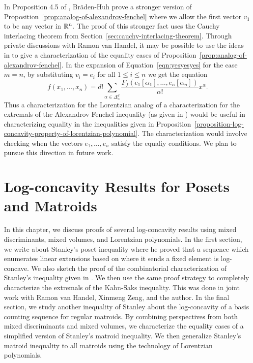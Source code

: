 \documentclass{puthesis-UG}
\begin{document}
\begin{remark}
	In Proposition 4.5 of \cite{lorentzian-polynomials}, Br\"aden-Huh prove a stronger version of Proposition~\ref{prop:analog-of-alexandrov-fenchel} where we allow the first vector $v_1$ to be any vector in $\mathbb{R}^n$. The proof of this stronger fact uses the Cauchy interlacing theorem from Section~\ref{sec:cauchy-interlacing-theorem}. Through private discussions with Ramon van Handel, it may be possible to use the ideas in \cite{shenfeld2022extremals} to give a characterization of the equality cases of Proposition~\ref{prop:analog-of-alexandrov-fenchel}. In the expansion of Equation~\ref{eqn:yesyesyes} for the case $m = n$, by substituting $v_i = e_i$ for all $1 \leq i \leq n$ we get the equation
	\[
		f(x_1, \ldots, x_n) = d! \sum_{\alpha \in \Delta_n^d} \frac{F_f(e_1 [\alpha_1], \ldots, e_n [\alpha_n])}{\alpha!} x^\alpha.
	\]
	Thus a characterization for the Lorentzian analog of a characterization for the extremals of the Alexandrov-Fenchel inequality (as given in \cite{shenfeld2022extremals}) would be useful in characterizing equality in the inequalities given in Proposition~\ref{proposition-log-concavity-property-of-lorentzian-polynomial}. The characterization would involve checking when the vectors $e_1, \ldots, e_n$ satisfy the equaliy conditions. We plan to pursue this direction in future work.
\end{remark}

\chapter{Log-concavity Results for Posets and Matroids} \label{log-concavity-results}

In this chapter, we discuss proofs of several log-concavity results using mixed discriminants, mixed volumes, and Lorentzian polynomials. In the first section, we write about Stanley's poset inequality where he proved that a sequence which enumerates linear extensions based on where it sends a fixed element is log-concave. We also sketch the proof of the combinatorial characterization of Stanley's inequality given in \cite{shenfeld2022extremals}. We then use the same proof strategy to completely characterize the extremals of the Kahn-Saks inequality. This was done in joint work with Ramon van Handel, Xinmeng Zeng, and the author. In the final section, we study another inequality of Stanley about the log-concavity of a basis counting sequence for regular matroids. By combining perspectives from both mixed discriminants and mixed volumes, we characterize the equality cases of a simplified version of Stanley's matroid inequality. We then generalize Stanley's matroid inequality to all matroids using the technology of Lorentzian polynomials. 
\end{document}
